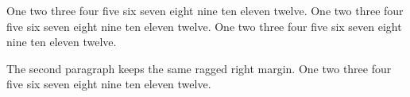 \nopagenumbers
{}
\parindent0pt
\hyphenchar{}
\raggedright
One two three four five six seven eight nine ten eleven twelve.
One two three four five six seven eight nine ten eleven twelve.
One two three four five six seven eight nine ten eleven twelve.
\par
The second paragraph keeps the same ragged right margin.
One two three four five six seven eight nine ten eleven twelve.
\par\bye
